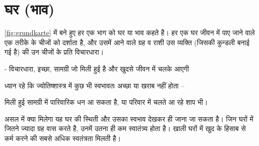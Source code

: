 \section[घर]{घर (भाव)} \label{sec:haus}
\autoref{fig:grundkarte} में बने हुए हर एक भाग को घर या भाव कहते है। हर एक घर जीवन में पाए जाने वाले एक तरीके के चीजों को दर्शाता है, और उसमें आने वाले ग्रह व राशी उस व्यक्ति (जिसकी कुन्डली बनाई गई है) की उन चीजों के प्रति विचारधारा।
\begin{setdef}
     - विचारधारा, इच्छा, सामग्री जो मिली हुई है और खुदसे जीवन में चलके आएगी
\end{setdef}
ध्यान रहे कि ज्योतिष्शास्त्र में कुछ भी स्वभावतः अच्छा या खराब नहीं होता --
\begin{example}
मिली हुई सामग्री में पारिवारिक धन आ सकता है, या परिवार में चलते आ रहे शाप भी। 
\end{example}
असल में क्या मिलेगा यह घर की स्थिती और उसका स्वभाव देखकर ही जाना जा सकता है। जिन घरों में जितने ज्यादा ग्रह वास करते है, उनमें उतना ही कम स्वातंत्र्य होता है। खाली घरों में खुद के हिसाब से कर्म करने की सबसे अधिक स्वतंत्रता मिलती है।


